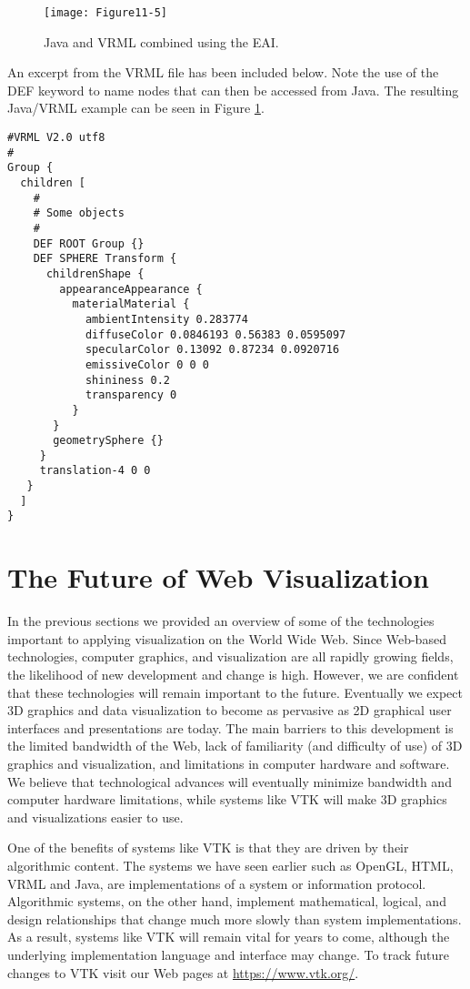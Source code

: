 \begin{figure}[!htb]
  \centering
  \texttt{[image: Figure11-5]}\\
  \caption{ Java and VRML combined using the EAI.}\label{fig:Figure11-5}
\end{figure}

An excerpt from the VRML file has been included below. Note the use of the DEF keyword to name nodes that can then be accessed from Java. The resulting Java/VRML example can be seen in Figure \ref{fig:Figure11-5}.

\begin{lstlisting}[language=VRML, caption={}, numbers=none, frame=none]
#VRML V2.0 utf8
#
Group {
  children [ 
    #
    # Some objects
    #
    DEF ROOT Group {}
    DEF SPHERE Transform {
      childrenShape {
        appearanceAppearance {
          materialMaterial {
            ambientIntensity 0.283774
            diffuseColor 0.0846193 0.56383 0.0595097
            specularColor 0.13092 0.87234 0.0920716
            emissiveColor 0 0 0
            shininess 0.2
            transparency 0
          }
       }
       geometrySphere {}
     }
     translation-4 0 0
   }
  ]
}
\end{lstlisting}

\section{The Future of Web Visualization}

In the previous sections we provided an overview of some of the technologies important to applying visualization on the World Wide Web. Since Web-based technologies, computer graphics, and visualization are all rapidly growing fields, the likelihood of new development and change is high. However, we are confident that these technologies will remain important to the future. Eventually we expect 3D graphics and data visualization to become as pervasive as 2D graphical user interfaces and presentations are today. The main barriers to this development is the limited bandwidth of the Web, lack of familiarity (and difficulty of use) of 3D graphics and visualization, and limitations in computer hardware and software. We believe that technological advances will eventually minimize bandwidth and computer hardware limitations, while systems like VTK will make 3D graphics and visualizations easier to use.

One of the benefits of systems like VTK is that they are driven by their algorithmic content. The systems we have seen earlier such as OpenGL, HTML, VRML and Java, are implementations of a system or information protocol. Algorithmic systems, on the other hand, implement mathematical, logical, and design relationships that change much more slowly than system implementations. As a result, systems like VTK will remain vital for years to come, although the underlying implementation language and interface may change. To track future changes to VTK visit our Web pages at \href{https://www.vtk.org/}{https://www.vtk.org/}.


